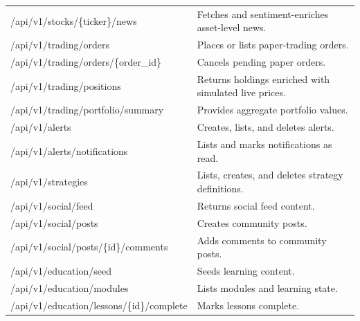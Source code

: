 \documentclass[12pt,a4paper]{report}
\begin{document}
\begin{longtable}{p{} p{}}
/api/v1/stocks/\{ticker\}/news & Fetches and sentiment-enriches asset-level news. \\
/api/v1/trading/orders & Places or lists paper-trading orders. \\
/api/v1/trading/orders/\{order\_id\} & Cancels pending paper orders. \\
/api/v1/trading/positions & Returns holdings enriched with simulated live prices. \\
/api/v1/trading/portfolio/summary & Provides aggregate portfolio values. \\
/api/v1/alerts & Creates, lists, and deletes alerts. \\
/api/v1/alerts/notifications & Lists and marks notifications as read. \\
/api/v1/strategies & Lists, creates, and deletes strategy definitions. \\
/api/v1/social/feed & Returns social feed content. \\
/api/v1/social/posts & Creates community posts. \\
/api/v1/social/posts/\{id\}/comments & Adds comments to community posts. \\
/api/v1/education/seed & Seeds learning content. \\
/api/v1/education/modules & Lists modules and learning state. \\
/api/v1/education/lessons/\{id\}/complete & Marks lessons complete. \\
\end{longtable}
\end{document}
